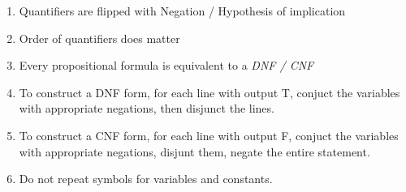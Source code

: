 \documentclass{homework}
\newcommand{\?}{\stackrel{?}{=}}
\theoremstyle{definition}
\begin{document}
\begin{enumerate}
    \item Quantifiers are flipped with Negation / Hypothesis of implication
    \item Order of quantifiers does matter
    \item Every propositional formula is equivalent to a \textit{DNF / CNF}
    \item To construct a DNF form, for each line with output T, conjuct the variables with appropriate negations, then disjunct the lines.
    \item To construct a CNF form, for each line with output F, conjuct the variables with appropriate negations, disjunt them, negate the entire statement. 
    \item Do not repeat symbols for variables and constants.
\end{enumerate}
\end{document}
